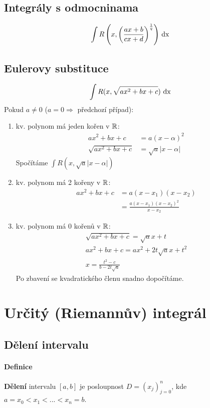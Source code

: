 \documentclass[a4paper,10pt]{article}
\begin{document}
\subsection{Integrály s odmocninama}
\setcounter{equation}{0}
\begin{align*}
	\int R\left( x, \left (\frac{ax + b}{cx+d}\right)^\frac{1}{q} \right) \operatorname*{\,dx}
\end{align*}

\subsection{Eulerovy substituce}
\setcounter{equation}{0}
\begin{align*}
	\int R(x, \sqrt{ax^2 + bx + c}) \operatorname*{\,dx}
\end{align*}
Pokud $a \neq 0$ ($a = 0 \Rightarrow$ předchozí případ):
\begin{enumerate}
	\item  kv. polynom má jeden kořen v $\mathbb{R}$:
	\begin{align*}
		ax^2 + bx + c &= a(x-\alpha)^2 \\
		\sqrt{ax^2 + bx + c} &= \sqrt{a} |x - \alpha|
	\end{align*}
	Spočítáme $\int R(x, \sqrt{a}|x-\alpha|)$
	\item  kv. polynom má 2 kořeny v $\mathbb{R}$:
	\begin{align*}
		ax^2 + bx + c &= a(x-x_1)(x-x_2) \\
		&= \frac{a(x-x_1)(x-x_2)^2}{x-x_2}
	\end{align*}
	\item  kv. polynom má 0 kořenů v $\mathbb{R}$:
	\begin{align*}
		\sqrt{ax^2 + bx + c} = \sqrt{a} x + t \\
		ax^2 + bx + c = ax^2 + 2t\sqrt{a}x + t^2 \\
		x = \frac{t^2-c}{b-2t\sqrt{a}} 
	\end{align*}
	Po zbavení se kvadratického členu snadno dopočítáme.
\end{enumerate}


\newpage
\section{Určitý (Riemannův) integrál}
\subsection{Dělení intervalu}
\setcounter{equation}{0}
\paragraph{Definice}
\textbf{Dělení} intervalu $[a,b]$ je posloupnost $D = (x_j)_{j=0}^n$, kde $a = x_0 < x_1 <
... < x_n = b$.
\end{document}
